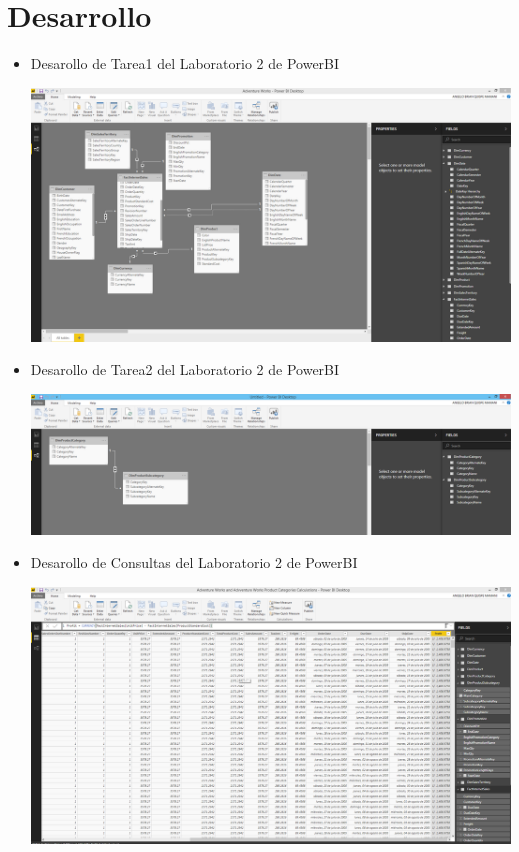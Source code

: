 \section{Desarrollo } 

\begin{itemize}



\item Desarollo de Tarea1 del Laboratorio 2 de PowerBI
\begin{center}
\includegraphics[scale=0.30]{./Imagenes/1.png}
\end{center}


\item Desarollo de Tarea2 del Laboratorio 2 de PowerBI
\begin{center}
\includegraphics[scale=0.30]{./Imagenes/2.png}
\end{center}


\item Desarollo de Consultas del Laboratorio 2 de PowerBI
\begin{center}
\includegraphics[scale=0.30]{./Imagenes/3.png}
\end{center}




\end{itemize}
